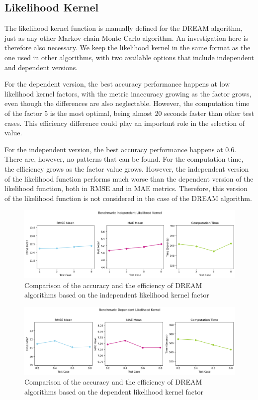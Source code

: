 \subsection{Likelihood Kernel}
The likelihood kernel function is manually defined for the DREAM algorithm, just as any other Markov chain Monte Carlo algorithm. An investigation here is therefore also necessary. We keep the likelihood kernel in the same format as the one used in other algorithms, with two available options that include independent and dependent versions.

For the dependent version, the best accuracy performance happens at low likelihood kernel factors, with the metric inaccuracy growing as the factor grows, even though the differences are also neglectable. However, the computation time of the factor $5$ is the most optimal, being almost 20 seconds faster than other test cases. This efficiency difference could play an important role in the selection of value.

For the independent version, the best accuracy performance happens at $0.6$. There are, however, no patterns that can be found. For the computation time, the efficiency grows as the factor value grows. However, the independent version of the likelihood function performs much worse than the dependent version of the likelihood function, both in RMSE and in MAE metrics. Therefore, this version of the likelihood function is not considered in the case of the DREAM algorithm.
\begin{figure}[H]
    \centering
    \includegraphics[width=1\textwidth]{figures/dream/indp_likelihood.png}
    \captionsetup{width=.8\textwidth}
    \caption{Comparison of the accuracy and the efficiency of DREAM algorithms based on the independent likelihood kernel factor}
    \label{fig:enter-label}
\end{figure}

\begin{figure}[H]
    \centering
    \includegraphics[width=1\textwidth]{figures/dream/dp_likelihood.png}
    \captionsetup{width=.8\textwidth}
    \caption{Comparison of the accuracy and the efficiency of DREAM algorithms based on the dependent likelihood kernel factor}
    \label{fig:enter-label}
\end{figure}

